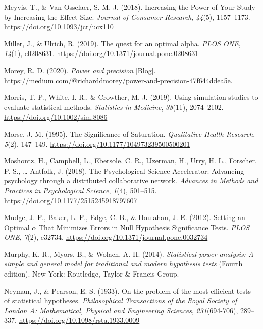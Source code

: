 \documentclass[
  english,
  ,jou, a4paper,floatsintext]{apa6}
\newlength{\cslhangindent}
\newenvironment{cslreferences}%
  {\setlength{\parindent}{0pt}%
  \everypar{\setlength{\hangindent}{\cslhangindent}}\ignorespaces}%
  {\par}
\begin{document}
\begin{cslreferences}
\leavevmode\hypertarget{ref-meyvis_increasing_2018}{}%
Meyvis, T., \& Van Osselaer, S. M. J. (2018). Increasing the Power of Your Study by Increasing the Effect Size. \emph{Journal of Consumer Research}, \emph{44}(5), 1157--1173. \url{https://doi.org/10.1093/jcr/ucx110}

\leavevmode\hypertarget{ref-miller_quest_2019}{}%
Miller, J., \& Ulrich, R. (2019). The quest for an optimal alpha. \emph{PLOS ONE}, \emph{14}(1), e0208631. \url{https://doi.org/10.1371/journal.pone.0208631}

\leavevmode\hypertarget{ref-morey_power_2020}{}%
Morey, R. D. (2020). \emph{Power and precision} {[}Blog{]}. https://medium.com/@richarddmorey/power-and-precision-47f644ddea5e.

\leavevmode\hypertarget{ref-morris_using_2019}{}%
Morris, T. P., White, I. R., \& Crowther, M. J. (2019). Using simulation studies to evaluate statistical methods. \emph{Statistics in Medicine}, \emph{38}(11), 2074--2102. \url{https://doi.org/10.1002/sim.8086}

\leavevmode\hypertarget{ref-morse_significance_1995}{}%
Morse, J. M. (1995). The Significance of Saturation. \emph{Qualitative Health Research}, \emph{5}(2), 147--149. \url{https://doi.org/10.1177/104973239500500201}

\leavevmode\hypertarget{ref-moshontz_psychological_2018}{}%
Moshontz, H., Campbell, L., Ebersole, C. R., IJzerman, H., Urry, H. L., Forscher, P. S., \ldots{} Antfolk, J. (2018). The Psychological Science Accelerator: Advancing psychology through a distributed collaborative network. \emph{Advances in Methods and Practices in Psychological Science}, \emph{1}(4), 501--515. \url{https://doi.org/10.1177/2515245918797607}

\leavevmode\hypertarget{ref-mudge_setting_2012}{}%
Mudge, J. F., Baker, L. F., Edge, C. B., \& Houlahan, J. E. (2012). Setting an Optimal \(\alpha\) That Minimizes Errors in Null Hypothesis Significance Tests. \emph{PLOS ONE}, \emph{7}(2), e32734. \url{https://doi.org/10.1371/journal.pone.0032734}

\leavevmode\hypertarget{ref-murphy_statistical_2014}{}%
Murphy, K. R., Myors, B., \& Wolach, A. H. (2014). \emph{Statistical power analysis: A simple and general model for traditional and modern hypothesis tests} (Fourth edition). New York: Routledge, Taylor \& Francis Group.

\leavevmode\hypertarget{ref-neyman_problem_1933}{}%
Neyman, J., \& Pearson, E. S. (1933). On the problem of the most efficient tests of statistical hypotheses. \emph{Philosophical Transactions of the Royal Society of London A: Mathematical, Physical and Engineering Sciences}, \emph{231}(694-706), 289--337. \url{https://doi.org/10.1098/rsta.1933.0009}


\end{cslreferences}
\end{document}
